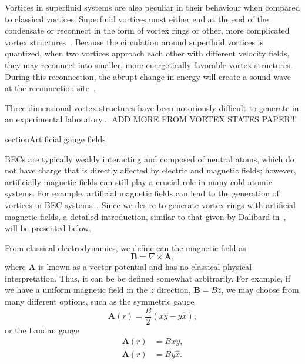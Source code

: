 Vortices in superfluid systems are also peculiar in their behaviour when compared to classical vortices.
Superfluid vortices must either end at the end of the condensate or reconnect in the form of vortex rings or other, more complicated vortex structures~\cite{Reichl2013}.
Because the circulation around superfluid vortices is quantized, when two vortices approach each other with different velocity fields, they may reconnect into smaller, more energetically favorable vortex structures.
During this reconnection, the abrupt change in energy will create a sound wave at the reconnection site~\cite{Feynman1955}.

Three dimensional vortex structures have been notoriously difficult to generate in an experimental laboratory... ADD MORE FROM VORTEX STATES PAPER!!!

section{Artificial gauge fields}
\label{sec:gauge}

BECs are typically weakly interacting and composed of neutral atoms, which do not have charge that is directly affected by electric and magnetic fields; however, artificially magnetic fields can still play a crucial role in many cold atomic systems.
For example, artificial magnetic fields can lead to the generation of vortices in BEC systems~\cite{Lin2009}.
Since we desire to generate vortex rings with artificial magnetic fields, a detailed introduction, similar to that given by Dalibard in~\cite{Dalibard2015}, will be presented below.

From classical electrodynamics, we define can the magnetic field as
\begin{equation}
\mathbf{B} = \nabla \times \mathbf{A},
\end{equation}
where $\mathbf{A}$ is known as a vector potential and has no classical physical interpretation.
Thus, it can be be defined somewhat arbitrarily.
For example, if we have a uniform magnetic field in the $\hat z$ direction, $\mathbf{B} = B \hat z$, we may choose from many different options, such as the symmetric gauge
\begin{equation}
\mathbf{A}(r) = \frac{B}{2}(x \hat y - y \hat x),
\end{equation}
or the Landau gauge
\begin{equation}
\begin{split}
\mathbf{A}(r) &= Bx \hat y, \\
\mathbf{A}(r) &= By \hat x.
\end{split}
\end{equation}

